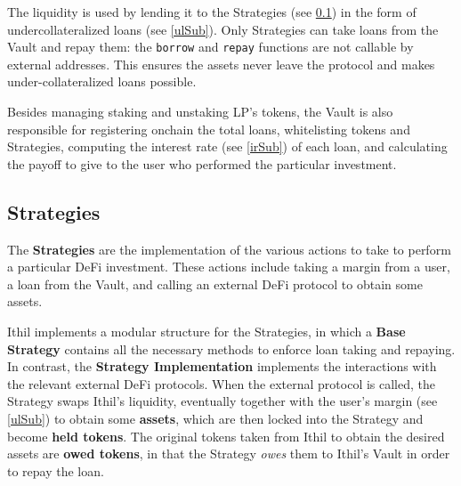 \documentclass[a4paper,10 pt]{article}
\theoremstyle{definition}
\begin{document}
The liquidity is used by lending it to the Strategies (see \ref{stratSub}) in the form of undercollateralized loans (see \ref{ulSub}). Only Strategies can take loans from the Vault and repay them: the \verb|borrow| and \verb|repay| functions are not callable by external addresses. This ensures the assets never leave the protocol and makes under-collateralized loans possible.

Besides managing staking and unstaking LP's tokens, the Vault is also responsible for registering onchain the total loans, whitelisting tokens and Strategies, computing the interest rate (see \ref{irSub}) of each loan, and calculating the payoff to give to the user who performed the particular investment.

\subsection{Strategies}\label{stratSub}

The {\bf Strategies} are the implementation of the various actions to take to perform a particular DeFi investment. These actions include taking a margin from a user, a loan from the Vault, and calling an external DeFi protocol to obtain some assets.

Ithil implements a modular structure for the Strategies, in which a {\bf Base Strategy} contains all the necessary methods to enforce loan taking and repaying. In contrast, the {\bf Strategy Implementation} implements the interactions with the relevant external DeFi protocols. When the external protocol is called, the Strategy swaps Ithil's liquidity, eventually together with the user's margin (see \ref{ulSub}) to obtain some {\bf assets}, which are then locked into the Strategy and become {\bf held tokens}. The original tokens taken from Ithil to obtain the desired assets are {\bf owed tokens}, in that the Strategy {\it owes} them to Ithil's Vault in order to repay the loan.
\end{document}
